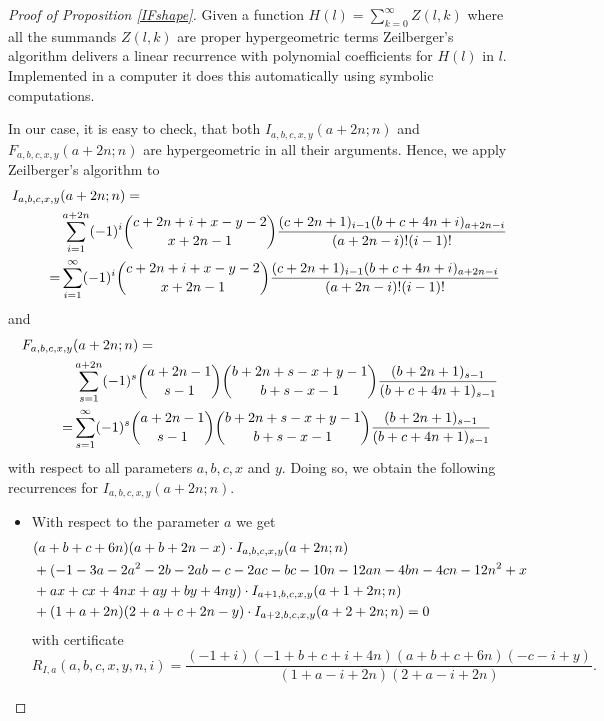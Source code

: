 \documentclass{amsart}
\numberwithin{equation}{section}
\begin{document}
\begin{proof}[Proof of Proposition \ref{IFshape}]
    Given a function $H(l)=\sum_{k=0}^\infty Z(l,k)$ where all the summands $Z(l,k)$ are proper hypergeometric terms Zeilberger's algorithm delivers a linear recurrence with polynomial coefficients for $H(l)$ in $l$. Implemented in a computer it does this automatically using symbolic computations. 

    In our case, it is easy to check, that both $I_{a,b,c,x,y}(a+2n;n)$ and $F_{a,b,c,x,y}(a+2n;n)$ are hypergeometric in all their arguments. Hence, we apply Zeilberger's algorithm to
    \begin{align}
        I_{a,b,c,x,y}&(a+2n;n)=\notag\\ 
        &\sum_{i=1}^{a+2n}(-1)^{i}\binom{c+2n+i+x-y-2}{x+2n-1}\frac{(c+2n+1)_{i-1}(b+c+4n+i)_{a+2n-i}}{(a+2n-i)!(i-1)!}\notag\\
        =&\sum_{i=1}^{\infty}(-1)^{i}\binom{c+2n+i+x-y-2}{x+2n-1}\frac{(c+2n+1)_{i-1}(b+c+4n+i)_{a+2n-i}}{(a+2n-i)!(i-1)!}\notag
    \end{align}
    and
    \begin{align}
        F_{a,b,c,x,y}&(a+2n;n)=\notag \\ &\sum_{s=1}^{a+2n} (-1)^s\binom{a+2n-1}{s-1}\binom{b+2n+s-x+y-1}{b+s-x-1}\frac{(b+2n+1)_{s-1}}{(b+c+4n+1)_{s-1}}\notag\\
        =&\sum_{s=1}^{\infty} (-1)^s\binom{a+2n-1}{s-1}\binom{b+2n+s-x+y-1}{b+s-x-1}\frac{(b+2n+1)_{s-1}}{(b+c+4n+1)_{s-1}}\notag
    \end{align}
    with respect to all parameters $a,b,c,x$ and $y$. 
    Doing so, we obtain the following recurrences for $I_{a,b,c,x,y}(a+2n;n)$.
    \begin{itemize}
        \item With respect to the parameter $a$ we get
        \begin{align}
            &(a+b+c+6n)(a+b+2n-x)\cdot I_{a,b,c,x,y}(a+2n;n)\hphantom{a}   \label{arec}\\
            &+(-1-3a-2a^2-2b-2ab-c-2ac-bc-10n - 12 a n - 4 b n - 4 c n - 12 n^2 + x  \hphantom{a}\notag\\
            &+a x + c x +4 n x + a y + b y + 4 n y)\cdot I_{a+1,b,c,x,y}(a+1+2n;n)  \hphantom{a}\notag\\
            &+(1 + a + 2 n) (2 + a + c + 2 n - y)\cdot I_{a+2,b,c,x,y}(a+2+2n;n) =0\notag
        \end{align}
        with certificate 
        \[R_{I,a}(a,b,c,x,y,n,i)=\frac{(-1 + i) (-1 + b + c + i + 4 n) (a + b + c + 6 n) (-c - i + y)}{(1 + a - i + 2 n) (2 + a - i + 2 n)}.\]

\end{itemize}
\end{proof}
\end{document}
